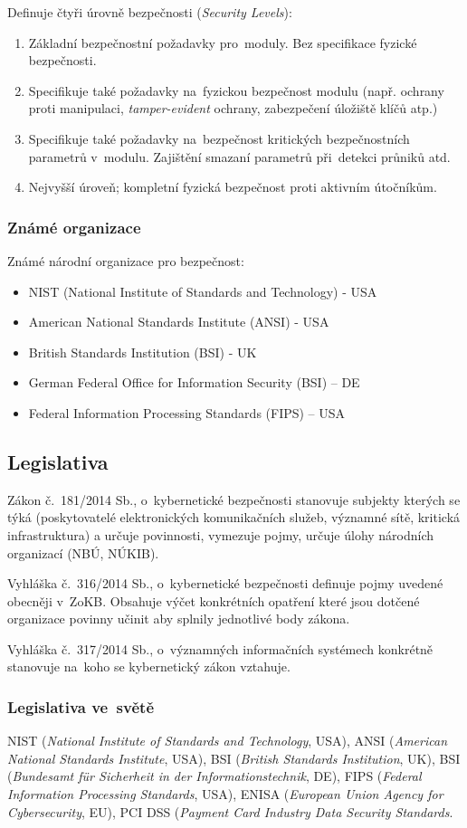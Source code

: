 Definuje čtyři úrovně bezpečnosti (\emph{Security Levels}):
\begin{enumerate}
\item
    Základní bezpečnostní požadavky pro~moduly.
    Bez specifikace fyzické bezpečnosti.
\item
	Specifikuje také požadavky na~fyzickou bezpečnost modulu (např. ochrany proti manipulaci, \emph{tamper-evident} ochrany, zabezpečení úložiště klíčů atp.)
\item
	Specifikuje také požadavky na~bezpečnost kritických bezpečnostních parametrů v~modulu.
	Zajištění smazaní parametrů při~detekci průniků atd.
\item
	Nejvyšší úroveň; kompletní fyzická bezpečnost proti aktivním útočníkům.
\end{enumerate}


\subsubsection{Známé organizace}
Známé národní organizace pro bezpečnost:
\begin{itemize}
    \item NIST (National Institute of Standards and Technology) - USA
    \item American National Standards Institute (ANSI) - USA
    \item British Standards Institution (BSI) - UK
    \item German Federal Office for Information Security (BSI) – DE
    \item Federal Information Processing Standards (FIPS) – USA
\end{itemize}


\subsection{Legislativa}

Zákon č.~181/2014 Sb., o~kybernetické bezpečnosti stanovuje subjekty kterých se týká (poskytovatelé elektronických komunikačních služeb, významné sítě, kritická infrastruktura) a určuje povinnosti, vymezuje pojmy, určuje úlohy národních organizací (NBÚ, NÚKIB).

Vyhláška č.~316/2014 Sb., o~kybernetické bezpečnosti definuje pojmy uvedené obecněji v~ZoKB.
Obsahuje výčet konkrétních opatření které jsou dotčené organizace povinny učinit aby splnily jednotlivé body zákona.

Vyhláška č.~317/2014 Sb., o~významných informačních systémech konkrétně stanovuje na~koho se kybernetický zákon vztahuje.


\subsubsection{Legislativa ve~světě}

NIST (\emph{National Institute of Standards and Technology}, USA),
ANSI (\emph{American National Standards Institute}, USA),
BSI (\emph{British Standards Institution}, UK),
BSI (\emph{Bundesamt für Sicherheit in der Informationstechnik}, DE),
FIPS (\emph{Federal Information Processing Standards}, USA),
ENISA (\emph{European Union Agency for Cybersecurity}, EU),
PCI DSS (\emph{Payment Card Industry Data Security Standards}.
